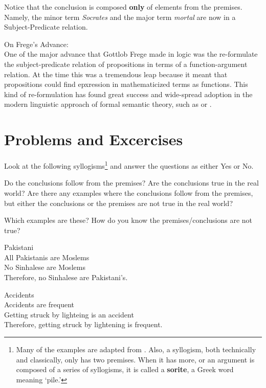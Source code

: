 \documentclass{article}
\begin{document}
Notice that the conclusion is composed \textbf{only} of elements from the premises. Namely, the minor term \textsl{Socrates} and the major term \textsl{mortal} are now in a Subject-Predicate relation. 

\begin{remark} On Frege's Advance:\\
One of the major advance that Gottlob Frege made in logic was the re-formulate the subject-predicate relation of propositions in terms of a function-argument relation. At the time this was a tremendous leap because it meant that propositions could find epxression in mathematicized terms as functions. This kind of re-formulation has found great success and wide-spread adoption in the modern linguistic approach of formal semantic theory, such as \cite{chmg:2000} or \cite{heimkratzer98semantics}.
\end{remark} 


\section{Problems and Excercises}
Look at the following syllogisms\footnote{Many of the examples are adapted from \cite{barker03logic}. Also, a syllogism, both technically and classically, only has two premises. When it has more, or an argument is composed of a series of syllogisms, it is called a \textbf{sorite}, a Greek word meaning `pile.'} and answer the questions as either Yes or No.

\begin{exe}
\ex Do the conclusions follow from the premises?
\ex Are the conclusions true in the real world?
\ex Are there any examples where the conclusions follow from the premises, but either the conclusions or the premises are not true in the real world?
\begin{xlist}
\ex Which examples are these?
\ex How do you know the premises/conclusions are not true?
\end{xlist}
\end{exe}


\begin{syllogism} Pakistani\\
All Pakistanis are Moslems\\
No Sinhalese are Moslems\\
Therefore, no Sinhalese are Pakistani's.\\
\end{syllogism}

\begin{syllogism} Accidents\\
Accidents are frequent\\
Getting struck by lighteing is an accident\\
Therefore, getting struck by lightening is frequent.\\
\end{syllogism}
\end{document}
